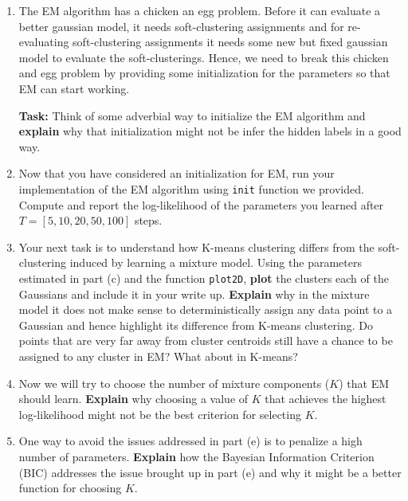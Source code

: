 \begin{enumerate}
\begin{enumerate}
\item The EM algorithm has a chicken an egg problem. Before it can evaluate a better gaussian model, it needs soft-clustering assignments and for re-evaluating soft-clustering assignments it needs some new but fixed gaussian model to evaluate the soft-clusterings. Hence, we need to break this chicken and egg problem by providing some initialization for the parameters so that EM can start working.

	\textbf{Task:} Think of some adverbial way to initialize the EM algorithm and \textbf{explain} why that initialization might not be infer the hidden labels in a good way.

\item Now that you have considered an initialization for EM, run your implementation of the EM algorithm using \texttt{init} function we provided. Compute and report the log-likelihood of the parameters you learned after $T=[5, 10, 20, 50, 100]$ steps.

\item Your next task is to understand how K-means clustering differs from the soft-clustering induced by learning a mixture model. Using the parameters estimated in part (c) and the function \texttt{plot2D}, \textbf{plot} the clusters each of the  Gaussians and include it in your write up. \textbf{Explain} why in the mixture model it does not make sense to deterministically assign any data point to a Gaussian and hence highlight its difference from K-means clustering. Do points that are very far away from cluster centroids still have a chance to be assigned to any cluster in EM? What about in K-means?\\

\item Now we will try to choose the number of mixture components ($K$) that EM should learn. \textbf{Explain} why choosing a value of $K$ that achieves the highest log-likelihood might not be the best criterion for selecting $K$.

\item One way to avoid the issues addressed in part (e) is to penalize a high number of parameters. \textbf{Explain} how the Bayesian Information Criterion (BIC) addresses the issue brought up in part (e) and why it might be a better function for choosing $K$.


\end{enumerate}
\end{enumerate}
